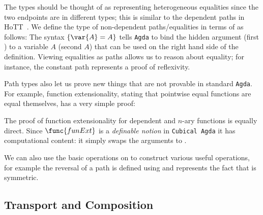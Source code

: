 The  types should be thought of as representing
heterogeneous equalities since the two endpoints are in different
types; this is similar to the dependent paths in
HoTT~. We define the type of non-dependent
paths/equalities in terms of  as follows:
%
%
The syntax $\{\var{A} = A\}$ tells \texttt{Agda} to bind the hidden
argument  (first ) to a variable $A$ (second $A$) that
can be used on the right hand side of the definition. Viewing
equalities as paths allows us to reason about equality; for
instance, the constant path represents a proof of reflexivity.
%


Path types also let us prove new things that are not provable in
standard \texttt{Agda}. For example, function extensionality, stating
that pointwise equal functions are equal themselves, has a very simple
proof:
%

The proof of function extensionality for dependent and $n$-ary
functions is equally direct. Since $\func{funExt}$ is a
\emph{definable notion} in \texttt{Cubical Agda} it has computational
content: it simply swaps the arguments to .

We can also use the basic operations on  to construct various
useful operations, for example the reversal of a path is defined
using  and represents the fact that  is symmetric.
%

\subsection{Transport and Composition}

